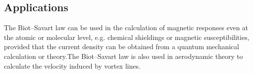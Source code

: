 \documentclass[a4paper,12pt]{article}
\begin{document}
\subsection{Applications}
The Biot–Savart law can be used in the calculation of magnetic responses even at the atomic or molecular level, e.g. chemical shieldings or magnetic susceptibilities, provided that the current density can be obtained from a quantum mechanical calculation or theory.The Biot–Savart law is also used in aerodynamic theory to calculate the velocity induced by vortex lines.\cite{webref1}



\end{document}
